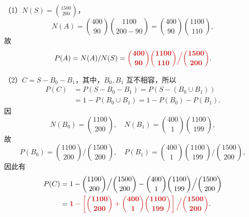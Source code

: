 \documentclass[11pt, UTF8]{ctexart}
\newcommand{\Prob}{P}
\newcommand{\ans}[1]{\mathbf{\color{fred}#1}}
\begin{document}
（1）$N(S)=\binom{1500}{200}$，
\[ N(A)=\binom{400}{90}\binom{1100}{200-90}=\binom{400}{90}\binom{1100}{110}, \]
故
\[ \Prob(A) = N(A)/N(S) = \ans{\binom{400}{90}\binom{1100}{110} \Big/ \binom{1500}{200}}. \]

（2）$C = S-B_0-B_1$，其中，$B_0, B_1$ 互不相容，所以
\begin{align*}
    \Prob(C) &= \Prob(S-B_0-B_1) = \Prob(S-(B_0 \cup B_1)) \\
    &= 1-\Prob(B_0 \cup B_1) = 1-\Prob(B_0)-\Prob(B_1).
\end{align*}
因
\[ N(B_0)=\binom{1100}{200}, \quad N(B_1)=\binom{400}{1}\binom{1100}{199}, \]
故
\[ \Prob(B_0)=\binom{1100}{200} \Big/ \binom{1500}{200}, \quad \Prob(B_1)=\binom{400}{1}\binom{1100}{199} \Big/ \binom{1500}{200}, \]
因此有
\begin{align*}
    \Prob(C) &= 1-\binom{1100}{200} \Big/ \binom{1500}{200} - \binom{400}{1}\binom{1100}{199} \Big/ \binom{1500}{200} \\
    &= \ans{1-\left[ \binom{1100}{200} + \binom{400}{1}\binom{1100}{199} \right] \Big/ \binom{1500}{200}}.
\end{align*}
\end{document}
